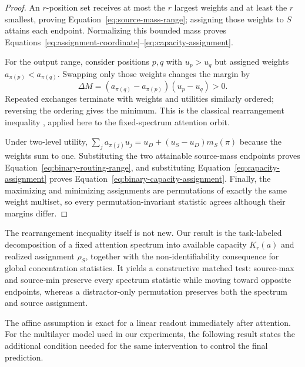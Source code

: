 \documentclass[letterpaper]{article} %
\begin{document}
\begin{proof}
An $r$-position set receives at most the $r$ largest weights and at least the $r$ smallest, proving
Equation~\ref{eq:source-mass-range}; assigning those weights to $S$ attains each endpoint.
Normalizing this bounded mass proves Equations~\ref{eq:assignment-coordinate}--\ref{eq:capacity-assignment}.

For the output range, consider positions $p,q$ with $u_p>u_q$ but assigned weights
$a_{\pi(p)}<a_{\pi(q)}$. Swapping only those weights changes the margin by
\begin{equation}
\Delta M=(a_{\pi(q)}-a_{\pi(p)})(u_p-u_q)>0.
\label{eq:pairwise-exchange}
\end{equation}
Repeated exchanges terminate with weights and utilities similarly ordered; reversing the ordering gives the
minimum. This is the classical rearrangement inequality \citep{hardylittlewoodpolya1952}, applied here to
the fixed-spectrum attention orbit.

Under two-level utility,
$\sum_j a_{\pi(j)}u_j=u_D+(u_S-u_D)m_S(\pi)$ because the weights sum to one.
Substituting the two attainable source-mass endpoints proves Equation~\ref{eq:binary-routing-range}, and
substituting Equation~\ref{eq:capacity-assignment} proves Equation~\ref{eq:binary-capacity-assignment}.
Finally, the maximizing and minimizing assignments are permutations of exactly the same weight multiset, so
every permutation-invariant statistic agrees although their margins differ.
\end{proof}

The rearrangement inequality itself is not new. Our result is the task-labeled decomposition of a fixed
attention spectrum into available capacity $K_r(a)$ and realized assignment $\rho_S$, together with the
non-identifiability consequence for global concentration statistics. It yields a constructive matched test:
source-max and source-min preserve every spectrum statistic while moving toward opposite endpoints, whereas
a distractor-only permutation preserves both the spectrum and source assignment.

The affine assumption is exact for a linear readout immediately after attention.
For the multilayer model used in our experiments, the following result states the additional condition needed
for the same intervention to control the final prediction.
\end{document}
